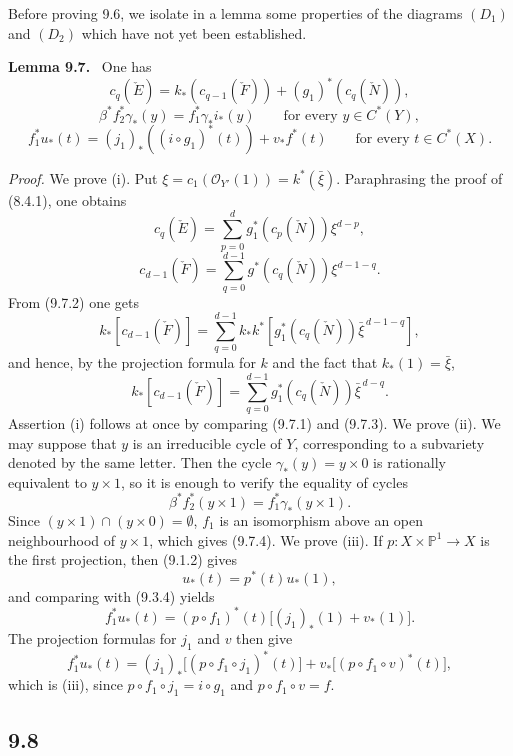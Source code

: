 \documentclass[11pt]{article}
\newenvironment{statement}[1]{\par\medskip\noindent\textbf{#1.}\ }{\par\medskip}
\begin{document}
Before proving 9.6, we isolate in a lemma some properties of the diagrams $(D_1)$ and $(D_2)$ which have not yet been established.

\begin{statement}{Lemma 9.7}
One has
\[
c_q(\check E)=k_*(c_{q-1}(\check F))+(g_1)^*(c_q(\check N)),
\tag{9.7 i}
\]
\[
\beta^*f_2^*\gamma_*(y)=f_1^*\gamma_*i_*(y)\qquad\text{for every }y\in C^*(Y),
\tag{9.7 ii}
\]
\[
f_1^*u_*(t)=(j_1)_*((i\circ g_1)^*(t))+v_*f^*(t)\qquad\text{for every }t\in C^*(X).
\tag{9.7 iii}
\]
\end{statement}

\emph{Proof.} We prove (i). Put $\xi=c_1(\mathcal O_{Y'}(1))=k^*(\bar\xi)$. Paraphrasing the proof of (8.4.1), one obtains
\[
c_q(\check E)=\sum_{p=0}^d g_1^*(c_p(\check N))\xi^{d-p},
\tag{9.7.1}
\]
\[
c_{d-1}(\check F)=\sum_{q=0}^{d-1}g^*(c_q(\check N))\xi^{d-1-q}.
\tag{9.7.2}
\]
From (9.7.2) one gets
\[
k_*[c_{d-1}(\check F)]
=\sum_{q=0}^{d-1}k_*k^*[g_1^*(c_q(\check N))\bar\xi^{\,d-1-q}],
\]
and hence, by the projection formula for $k$ and the fact that $k_*(1)=\bar\xi$,
\[
k_*[c_{d-1}(\check F)]=\sum_{q=0}^{d-1}g_1^*(c_q(\check N))\bar\xi^{\,d-q}.
\tag{9.7.3}
\]
Assertion (i) follows at once by comparing (9.7.1) and (9.7.3). We prove (ii). We may suppose that $y$ is an irreducible cycle of $Y$, corresponding to a subvariety denoted by the same letter. Then the cycle $\gamma_*(y)=y\times0$ is rationally equivalent to $y\times1$, so it is enough to verify the equality of cycles
\[
\beta^*f_2^*(y\times1)=f_1^*\gamma_*(y\times1).
\tag{9.7.4}
\]
Since $(y\times1)\cap(y\times0)=\emptyset$, $f_1$ is an isomorphism above an open neighbourhood of $y\times1$, which gives (9.7.4). We prove (iii). If $p:X\times\mathbb P^1\to X$ is the first projection, then (9.1.2) gives
\[
u_*(t)=p^*(t)u_*(1),
\tag{9.7.5}
\]
and comparing with (9.3.4) yields
\[
f_1^*u_*(t)=(p\circ f_1)^*(t)\bigl[(j_1)_*(1)+v_*(1)\bigr].
\tag{9.7.6}
\]
The projection formulas for $j_1$ and $v$ then give
\[
f_1^*u_*(t)=(j_1)_*\bigl[(p\circ f_1\circ j_1)^*(t)\bigr]+v_*\bigl[(p\circ f_1\circ v)^*(t)\bigr],
\tag{9.7.7}
\]
which is (iii), since $p\circ f_1\circ j_1=i\circ g_1$ and $p\circ f_1\circ v=f$.

\subsection*{9.8}
\end{document}
